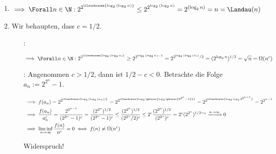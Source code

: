 \begin{solution}

\phantom{}

\begin{enumerate}

  \item 

  \begin{align*}
    \implies
    \Forall n \in \N:
    2^{2^{\floorbraces{\log_2{(\log_2{n})}}}}
    \leq
    2^{2^{\log_2{(\log_2{n})}}}
    =
    2^{(\log_2{n})}
    =
    n
    =
    \Landau(n)
  \end{align*}

  \item Wir behaupten, dass $c = 1/2$.

  \begin{itemize}

    \item
    [\Quote{$\leq$}:]

    \begin{align*}
      \implies
      \Forall n \in \N:
      2^{2^{\floorbraces{\log_2{(\log_2{n})}}}}
      \geq
      2^{2^{\log_2{(\log_2{n})} - 1}}
      =
      2^{2^{\log_2{(\log_2{(n)})}} / 2}
      =
      (2^{\log_2{n}})^{1/2}
      =
      \sqrt{n}
      =
      \Omega(n^c)
    \end{align*}

    \item
    [\Quote{$\geq$}:]
    Angenommen $c > 1/2$, dann ist $1/2 - c < 0$.
    Betrachte die Folge $a_n := 2^{2^n} - 1$.

    \begin{align*}
      & \implies
      f(a_n) = 2^{2^{\floorbraces{\log_2{(\log_2{(a_n)})}}}}
      =
      2^{2^{\floorbraces{\log_2 \pbraces{\log_2 \pbraces{2^{2^n} - 1}}}}}
      =
      2^{2^{\floorbraces{\log_2{\log_2{2^{2^{n-1}}}}}}}
      =
      2^{2^{n-1}} \\
      & \implies
      \frac{f(a_n)}{a_n^c}
      =
      \frac{2^{2^{n-1}}}{(2^{2^n} - 1)^c}
      =
      \frac{(2^{2^n})^{1/2}}{(2^{2^n} - 1)^c}
      \leq
      \frac{(2^{2^n})^{1/2}}{(2^{2^n}/2)^c}
      \leq
      2^c \frac{(2^{2^n})^{1/2}}{(2^{2^n})^c}
      =
      2^c (2^{2^n})^{1/2 - c}
      \xrightarrow{n \to \infty}
      0 \\
      & \implies
      \liminf_{n \to \infty}
      \frac{f(n)}{n^c} = 0
      \iff
      f(n) \neq \Omega(n^c)
    \end{align*}

    Widerspruch!
  
  \end{itemize}

\end{enumerate}

\end{solution}

